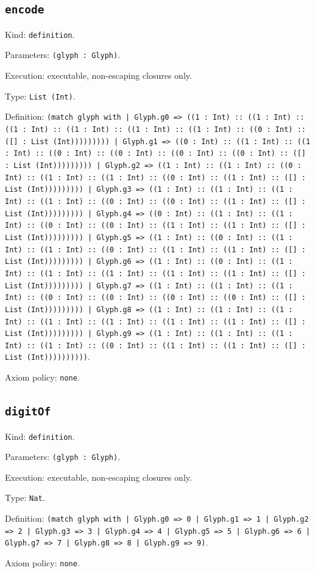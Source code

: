 \documentclass[11pt]{article}
\begin{document}
\subsection*{\texttt{encode}}
\noindent Kind: \texttt{definition}.\par
\noindent Parameters: \texttt{(glyph : Glyph)}.\par
\noindent Execution: executable, non-escaping closures only.\par
\noindent Type: \texttt{List (Int)}.\par
\noindent Definition: \texttt{(match glyph with | Glyph.g0 => ((1 : Int) :: ((1 : Int) :: ((1 : Int) :: ((1 : Int) :: ((1 : Int) :: ((1 : Int) :: ((0 : Int) :: ([] : List (Int))))))))) | Glyph.g1 => ((0 : Int) :: ((1 : Int) :: ((1 : Int) :: ((0 : Int) :: ((0 : Int) :: ((0 : Int) :: ((0 : Int) :: ([] : List (Int))))))))) | Glyph.g2 => ((1 : Int) :: ((1 : Int) :: ((0 : Int) :: ((1 : Int) :: ((1 : Int) :: ((0 : Int) :: ((1 : Int) :: ([] : List (Int))))))))) | Glyph.g3 => ((1 : Int) :: ((1 : Int) :: ((1 : Int) :: ((1 : Int) :: ((0 : Int) :: ((0 : Int) :: ((1 : Int) :: ([] : List (Int))))))))) | Glyph.g4 => ((0 : Int) :: ((1 : Int) :: ((1 : Int) :: ((0 : Int) :: ((0 : Int) :: ((1 : Int) :: ((1 : Int) :: ([] : List (Int))))))))) | Glyph.g5 => ((1 : Int) :: ((0 : Int) :: ((1 : Int) :: ((1 : Int) :: ((0 : Int) :: ((1 : Int) :: ((1 : Int) :: ([] : List (Int))))))))) | Glyph.g6 => ((1 : Int) :: ((0 : Int) :: ((1 : Int) :: ((1 : Int) :: ((1 : Int) :: ((1 : Int) :: ((1 : Int) :: ([] : List (Int))))))))) | Glyph.g7 => ((1 : Int) :: ((1 : Int) :: ((1 : Int) :: ((0 : Int) :: ((0 : Int) :: ((0 : Int) :: ((0 : Int) :: ([] : List (Int))))))))) | Glyph.g8 => ((1 : Int) :: ((1 : Int) :: ((1 : Int) :: ((1 : Int) :: ((1 : Int) :: ((1 : Int) :: ((1 : Int) :: ([] : List (Int))))))))) | Glyph.g9 => ((1 : Int) :: ((1 : Int) :: ((1 : Int) :: ((1 : Int) :: ((0 : Int) :: ((1 : Int) :: ((1 : Int) :: ([] : List (Int))))))))))}.\par
\noindent Axiom policy: \texttt{none}.\par
\subsection*{\texttt{digitOf}}
\noindent Kind: \texttt{definition}.\par
\noindent Parameters: \texttt{(glyph : Glyph)}.\par
\noindent Execution: executable, non-escaping closures only.\par
\noindent Type: \texttt{Nat}.\par
\noindent Definition: \texttt{(match glyph with | Glyph.g0 => 0 | Glyph.g1 => 1 | Glyph.g2 => 2 | Glyph.g3 => 3 | Glyph.g4 => 4 | Glyph.g5 => 5 | Glyph.g6 => 6 | Glyph.g7 => 7 | Glyph.g8 => 8 | Glyph.g9 => 9)}.\par
\noindent Axiom policy: \texttt{none}.\par
\end{document}
